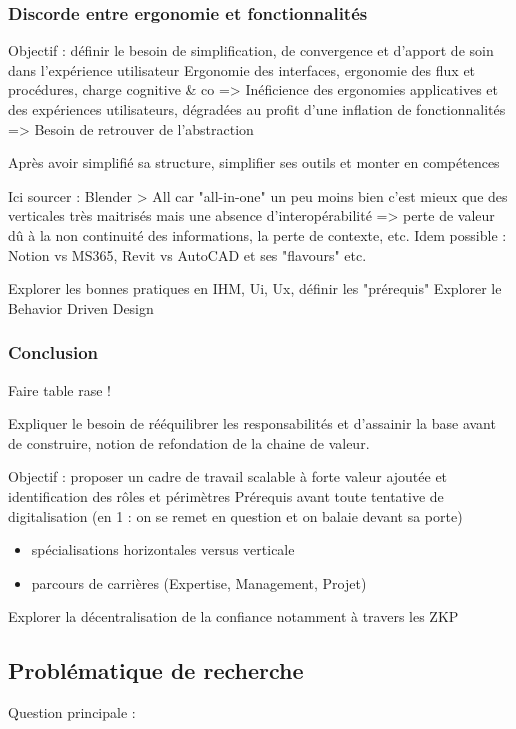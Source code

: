 \documentclass[a4paper,12pt]{article}
\begin{document}
\subsubsection{Discorde entre ergonomie et fonctionnalités}
\label{sec:org64b650f}
Objectif : définir le besoin de simplification, de convergence et d'apport de soin dans l'expérience utilisateur
Ergonomie des interfaces, ergonomie des flux et procédures, charge cognitive \& co
=> Inéficience des ergonomies applicatives et des expériences utilisateurs, dégradées au profit d'une inflation de fonctionnalités
=> Besoin de retrouver de l'abstraction

Après avoir simplifié sa structure, simplifier ses outils et monter en compétences

Ici sourcer : Blender > All car "all-in-one" un peu moins bien c'est mieux que des verticales très maitrisés mais une absence d'interopérabilité => perte de valeur dû à la non continuité des informations, la perte de contexte, etc.
Idem possible : Notion vs MS365, Revit vs AutoCAD et ses "flavours"
etc.

Explorer les bonnes pratiques en IHM, Ui, Ux, définir les "prérequis" 
Explorer le Behavior Driven Design 
\subsubsection{Conclusion}
\label{sec:org7c7f043}
Faire table rase !


Expliquer le besoin de rééquilibrer les responsabilités et d'assainir la base avant de construire, notion de refondation de la chaine de valeur.

Objectif : proposer un cadre de travail scalable à forte valeur ajoutée et identification des rôles et périmètres 
Prérequis avant toute tentative de digitalisation (en 1 : on se remet en question et on balaie devant sa porte)
\begin{itemize}
\item spécialisations horizontales versus verticale
\item parcours de carrières (Expertise, Management, Projet)
\end{itemize}

Explorer la décentralisation de la confiance notamment à travers les ZKP
\subsection{Problématique de recherche}
\label{sec:org274838b}
Question principale :
\end{document}
